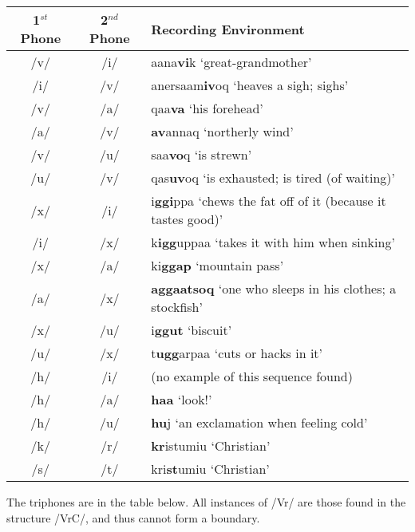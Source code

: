 \documentclass[12pt]{article}
\begin{document}
	\begin{tabular}{|c|c|l|}
	\hline
	1$^{st}$ Phone & 2$^{nd}$ Phone & Recording Environment \\
	\hline
	/v/ & /i/ & aana\textbf{vi}k `great-grandmother'\\
	/i/ & /v/ & anersaam\textbf{iv}oq `heaves a sigh; sighs'\\
	/v/ & /a/ & qaa\textbf{va} `his forehead'\\
	/a/ & /v/ & \textbf{av}annaq `northerly wind' \\
	/v/ & /u/ & saa\textbf{vo}q `is strewn'\\
	/u/ & /v/ & qas\textbf{uv}oq `is exhausted; is tired (of waiting)'\\
	/x/ & /i/ & i\textbf{ggi}ppa `chews the fat off of it (because it tastes good)'\\
	/i/ & /x/ & k\textbf{igg}uppaa `takes it with him when sinking'\\
	/x/ & /a/ & ki\textbf{ggap} `mountain pass'\\
	/a/ & /x/ & \textbf{aggaatsoq} `one who sleeps in his clothes; a stockfish'\\
	/x/ & /u/ & i\textbf{ggut} `biscuit'\\
	/u/ & /x/ & t\textbf{ugg}arpaa `cuts or hacks in it'\\
	/h/ & /i/ & (no example of this sequence found) \\
	/h/ & /a/ & \textbf{haa} `look!' \\
	/h/ & /u/ & \textbf{hu}j `an exclamation when feeling cold' \\
	/k/ & /r/ & \textbf{kr}istumiu `Christian'\\
	/s/ & /t/ & kri\textbf{st}umiu `Christian'\\
	\hline
	\end{tabular}
	\newpage
	The triphones are in the table below. All instances of /Vr/ are those found in the structure /VrC/, and thus cannot form a boundary. \par
\end{document}
